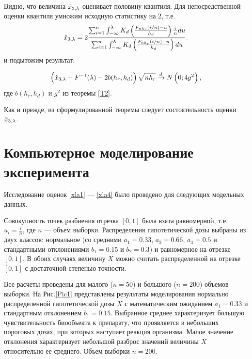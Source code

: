 \documentclass[a4paper,14pt,russian]{article}
\begin{document}
Видно, что величина $\hat{x}_{3,\lambda}$ оценивает половину квантиля. Для непосредственной оценки квантиля умножим исходную статистику на 2, т.е.
 \begin{equation*}
\hat{x}_{3,\lambda} =2 \frac{ \sum_{i=1}^{n} \int_{-\infty}^{\lambda} K_d\left(\frac{F_{n h_r}(i/n)-u}{h_d}\right)\frac{i}{n}du}{ \sum_{i=1}^{n} \int_{-\infty}^{\lambda} K_d\left(\frac{F_{n h_r}(i/n)-u}{h_d}\right)du}.
\end{equation*}
 и подытожим результат:
\begin{theorem}
   \begin{equation*}
   \left(\hat{x}_{3,\lambda} - F^{-1}(\lambda) - 2b(h_r,h_d)\right)\sqrt{n h_r} \xrightarrow{d} N\left(0;4g^2\right),
   \end{equation*}
   где
     $b(h_r,h_d)$ и $g^2$ из теоремы \eqref{T2}.
   \label{T3}
\end{theorem}

\begin{remark}
  Как и прежде, из сформулированной теоремы следует состоятельность оценки $\hat{x}_{3,\lambda}$.
\end{remark}
\newpage
\section{Компьютерное моделирование эксперимента}
Исследование оценок \eqref{xla1} --- \eqref{xla4} было проведено для следующих модельных данных.


Совокупность точек разбиения отрезка $[0,1]$ была взята равномерной, т.е. $u_i = \frac{i}{n}$, где $n$ --- объем выборки. Распределения гипотетической дозы выбраны из двух классов: нормальное (со средними $a_1 = 0.33$, $a_2 = 0.66$, $a_3 = 0.5$ и стандартными отклонениями $b_1 = 0.15$ и $b_2=0.3$) и равномерное на отрезке $[0,1]$. В обоих случаях величину $X$ можно считать распределенной на отрезке $[0,1]$ с достаточной степенью точности.

Все расчеты проведены для малого ($n=50$) и большого ($n=200$) объемов выборки.
\newpage
На Рис.\ref{Pic1} представлены результаты моделирования нормально распределенной гипотетической дозы $X$ с математическим ожиданием $a_1 = 0.33$ и стандартным отклонением $b_1 = 0.15$. Выбранное среднее характеризует большую чувствительность биообъекта к препарату, что проявляется в небольших пороговых дозах, при которых наступает реакция организма. Малое значение отклонения характеризует небольшой разброс значений величины $X$ относительно ее среднего. Объем выборки $n = 200$.
\end{document}
